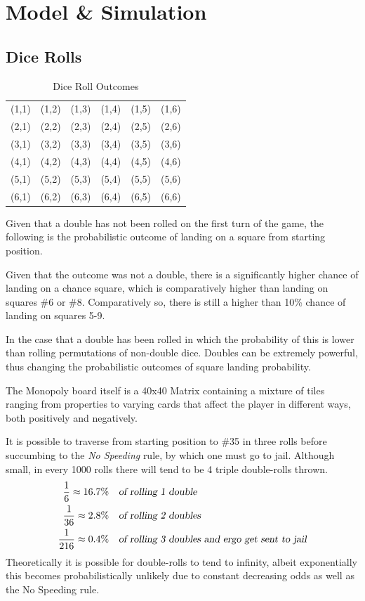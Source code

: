 \documentclass[12pt]{article}
\begin{document}
\section{Model \& Simulation}
\subsection{Dice Rolls}
\begin{table}[h]
\centering
\label{my-label}
\begin{tabular}{cccccc}
(1,1) & (1,2) & (1,3) & (1,4) & (1,5) & (1,6) \\
(2,1) & (2,2) & (2,3) & (2,4) & (2,5) & (2,6) \\
(3,1) & (3,2) & (3,3) & (3,4) & (3,5) & (3,6) \\
(4,1) & (4,2) & (4,3) & (4,4) & (4,5) & (4,6) \\
(5,1) & (5,2) & (5,3) & (5,4) & (5,5) & (5,6) \\
(6,1) & (6,2) & (6,3) & (6,4) & (6,5) & (6,6)
\end{tabular}
\caption{Dice Roll Outcomes}
\end{table}
Given that a double has not been rolled on the first turn of the game, the following is the probabilistic outcome of landing on a square from starting position.


Given that the outcome was not a double, there is a significantly higher chance of landing on a chance square, which is comparatively higher than landing on squares \#6 or \#8. Comparatively so, there is still a higher than 10\% chance of landing on squares 5-9.

In the case that a double has been rolled in which the probability of this is lower than rolling permutations of non-double dice. Doubles can be extremely powerful, thus changing the probabilistic outcomes of square landing probability. 

The Monopoly board itself is a 40x40 Matrix containing a mixture of tiles ranging from properties to varying cards that affect the player in different ways, both positively and negatively.

It is possible to traverse from starting position to \#35 in three rolls before succumbing to the \emph{No Speeding} rule, by which one must go to jail. Although small, in every 1000 rolls there will tend to be 4 triple double-rolls thrown.
\begin{align*}
\frac{1}{6}\approx16.7\% \quad &\textsl{of rolling 1 double}\\
\frac{1}{36}\approx2.8\% \quad &\textsl{of rolling 2 doubles}\\
\frac{1}{216}\approx0.4\% \quad &\textsl{of rolling 3 doubles and ergo get sent to jail} 
\end{align*}
Theoretically it is possible for double-rolls to tend to infinity, albeit exponentially this becomes probabilistically unlikely due to constant decreasing odds as well as the No Speeding rule.
\end{document}
